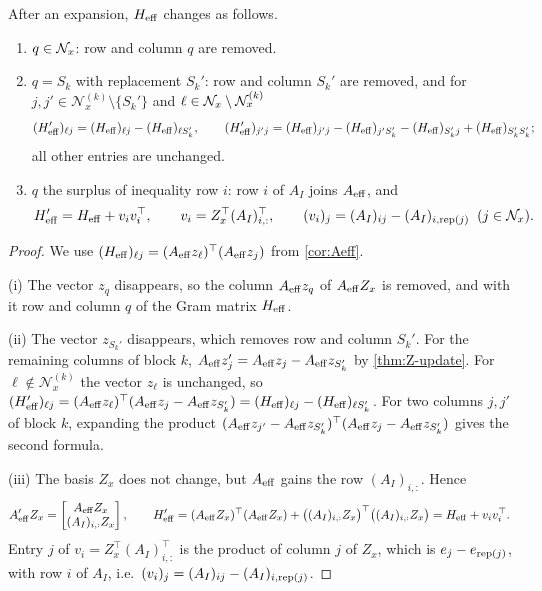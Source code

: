 \begin{theorem} \label{thm:H-expand}
After an expansion, $H_{\mathrm{eff}}$ changes as follows.
\begin{enumerate}
    \item \label{thm:H-expand:i} $q\in\mathcal{N}_x$: row and column $q$ are removed.
    \item \label{thm:H-expand:ii} $q = S_k$ with replacement $S_k'$: row and column $S_k'$ are removed, and for
          $j,j'\in\mathcal{N}_x^{(k)}\setminus\{S_k'\}$ and $\ell\in\mathcal{N}_x\setminus\mathcal{N}_x^{(k)}$
          \[
          (H_{\mathrm{eff}}')_{\ell j} = (H_{\mathrm{eff}})_{\ell j} - (H_{\mathrm{eff}})_{\ell S_k'},\qquad
          (H_{\mathrm{eff}}')_{j'j} = (H_{\mathrm{eff}})_{j'j} - (H_{\mathrm{eff}})_{j'S_k'} - (H_{\mathrm{eff}})_{S_k'j} + (H_{\mathrm{eff}})_{S_k'S_k'};
          \]
          all other entries are unchanged.
    \item \label{thm:H-expand:iii} $q$ the surplus of inequality row $i$: row $i$ of $A_I$ joins $A_{\mathrm{eff}}$, and
          \begin{equation} \label{eq:rank-one-up}
          H_{\mathrm{eff}}' = H_{\mathrm{eff}} + v_iv_i^\top,\qquad
          v_i = Z_x^\top (A_I)_{i,:}^\top,\qquad (v_i)_j = (A_I)_{ij} - (A_I)_{i,\operatorname{rep}(j)}\;\;(j\in\mathcal{N}_x).
          \end{equation}
\end{enumerate}
\end{theorem}

\begin{proof}
We use $(H_{\mathrm{eff}})_{\ell j} = (A_{\mathrm{eff}} z_\ell)^\top(A_{\mathrm{eff}} z_j)$ from \cref{cor:Aeff}.

(i) The vector $z_q$ disappears, so the column $A_{\mathrm{eff}} z_q$ of $A_{\mathrm{eff}} Z_x$ is removed, and with
it row and column $q$ of the Gram matrix $H_{\mathrm{eff}}$.

(ii) The vector $z_{S_k'}$ disappears, which removes row and column $S_k'$. For the remaining columns
of block $k$, $A_{\mathrm{eff}} z_j' = A_{\mathrm{eff}} z_j - A_{\mathrm{eff}} z_{S_k'}$ by \cref{thm:Z-update}. For
$\ell\notin\mathcal{N}_x^{(k)}$ the vector $z_\ell$ is unchanged, so
$(H_{\mathrm{eff}}')_{\ell j} = (A_{\mathrm{eff}} z_\ell)^\top(A_{\mathrm{eff}} z_j - A_{\mathrm{eff}} z_{S_k'}) = (H_{\mathrm{eff}})_{\ell j} - (H_{\mathrm{eff}})_{\ell S_k'}$.
For two columns $j, j'$ of block $k$, expanding the product
$(A_{\mathrm{eff}} z_{j'} - A_{\mathrm{eff}} z_{S_k'})^\top(A_{\mathrm{eff}} z_j - A_{\mathrm{eff}} z_{S_k'})$ gives the second formula.

(iii) The basis $Z_x$ does not change, but $A_{\mathrm{eff}}$ gains the row $(A_I)_{i,:}$. Hence
\[
A_{\mathrm{eff}}' Z_x = \begin{bmatrix}A_{\mathrm{eff}} Z_x\\ (A_I)_{i,:}Z_x\end{bmatrix},\qquad
H_{\mathrm{eff}}' = (A_{\mathrm{eff}} Z_x)^\top(A_{\mathrm{eff}} Z_x) + \bigl((A_I)_{i,:}Z_x\bigr)^\top\bigl((A_I)_{i,:}Z_x\bigr)
= H_{\mathrm{eff}} + v_iv_i^\top .
\]
Entry $j$ of $v_i = Z_x^\top(A_I)_{i,:}^\top$ is the product of column $j$ of $Z_x$, which is
$e_j - e_{\operatorname{rep}(j)}$, with row $i$ of $A_I$, i.e.\ $(v_i)_j = (A_I)_{ij} - (A_I)_{i,\operatorname{rep}(j)}$.
\end{proof}

